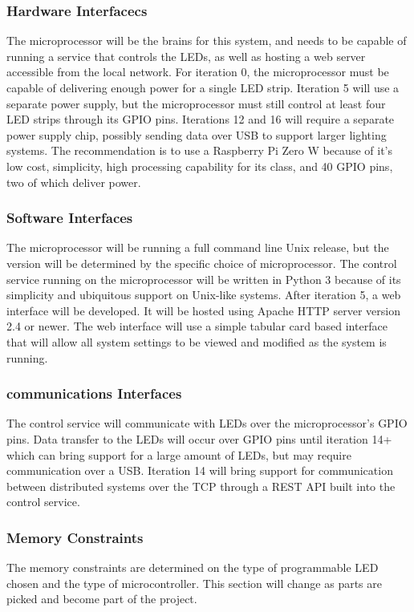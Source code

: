 \documentclass[onecolumn, draftclsnofoot,10pt, compsoc]{IEEEtran}
\begin{document}
				\subsubsection*{Hardware Interfacecs}
					The microprocessor will be the brains for this system, and needs to be capable of running a service that controls the LEDs, as well as hosting a web server accessible from the local network.
					For iteration 0, the microprocessor must be capable of delivering enough power for a single LED strip. Iteration 5 will use a separate power supply, but the microprocessor must still control
					at least four LED strips through its GPIO pins. Iterations 12 and 16 will require a separate power supply chip, possibly sending data over USB to support larger lighting systems.
					The recommendation is to use a Raspberry Pi Zero W because of it’s low cost, simplicity, high processing capability for its class, and 40 GPIO pins, two of which deliver power.
				\subsubsection*{Software Interfaces}
					The microprocessor will be running a full command line Unix release, but the version will be determined by the specific choice of microprocessor.
					The control service running on the microprocessor will be written in Python 3 because of its simplicity and ubiquitous support on Unix-like systems.
					After iteration 5, a web interface will be developed. It will be hosted using Apache HTTP server version 2.4 or newer. The web interface will use a simple tabular card based interface
					that will allow all system settings to be viewed and modified as the system is running.

				\subsubsection*{communications Interfaces}
					The control service will communicate with LEDs over the microprocessor's GPIO pins. Data transfer to the LEDs will occur over GPIO pins until iteration 14+ which can bring support for a
					large amount of LEDs, but may require communication over a USB.
					Iteration 14 will bring support for communication between distributed systems over the TCP through a REST API built into the control service.
				\subsubsection*{Memory Constraints}
					The memory constraints are determined on the type of programmable LED chosen and the type of microcontroller. This section will change as parts are picked and become part of the project.
\end{document}
